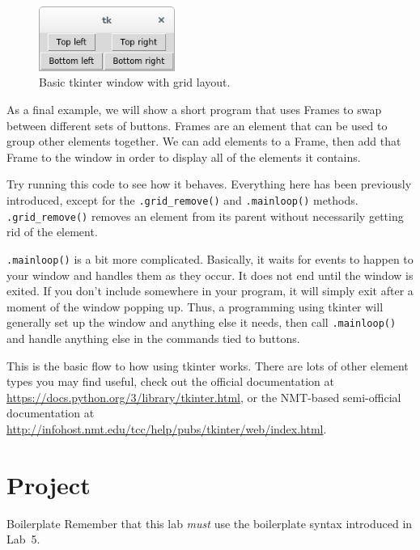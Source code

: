 \documentclass[11pt]{cselabheader}
\begin{document}
\begin{figure}[h]
  \centering
  \includegraphics[width=1.75in]{img/tk_grid}
  \caption{Basic tkinter window with grid layout.}
  \label{tk_grid}
\end{figure}

As a final example, we will show a short program that uses Frames to swap
between different sets of buttons. Frames are an element that can be used
to group other elements together. We can add elements to a Frame, then add
that Frame to the window in order to display all of the elements it contains.



Try running this code to see how it behaves. Everything here has been previously
introduced, except for the \lstinline{.grid_remove()} and \lstinline{.mainloop()}
methods. \lstinline{.grid_remove()} removes an element from its parent without
necessarily getting rid of the element.

\lstinline{.mainloop()} is a bit more
complicated. Basically, it waits for events to happen to your window and handles
them as they occur. It does not end until the window is exited. If you don't
include  somewhere in your program, it will simply exit
after a moment of the window popping up. Thus, a programming using tkinter
will generally set up the window and anything else it needs, then call
\lstinline{.mainloop()} and handle anything else in the commands tied to
buttons.

This is the basic flow to how using tkinter works. There are lots of other
element types you may find useful, check out the official documentation
at \url{https://docs.python.org/3/library/tkinter.html}, or the NMT-based
semi-official documentation at
\url{http://infohost.nmt.edu/tcc/help/pubs/tkinter/web/index.html}.

\pagebreak

\section{Project}
\label{sec:proj}

\begin{warningbox}{Boilerplate}
  Remember that this lab \emph{must} use the
  boilerplate syntax introduced in Lab~5.
\end{warningbox}
\end{document}

